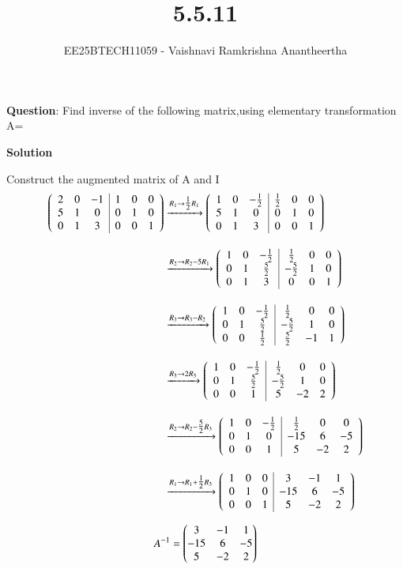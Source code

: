 \documentclass[journal]{IEEEtran}
\title{5.5.11}
\author{EE25BTECH11059 - Vaishnavi Ramkrishna Anantheertha}
\begin{document}
\maketitle

\renewcommand{\thefigure}{\theenumi}
\renewcommand{\thetable}{\theenumi}


\textbf{Question}:
Find inverse of the following matrix,using elementary transformation\\
A=


\textbf{Solution }


Construct the augmented matrix of A and I
\begin{align}
\augvec{3}{3}{
2 & 0 & -1 & 1 & 0 & 0 \\
5 & 1 & 0 & 0 & 1 & 0 \\
0 & 1 & 3 & 0 & 0 & 1}
&\xrightarrow{R_1 \to \tfrac{1}{2}R_1}
\augvec{3}{3}{
1 & 0 & -\tfrac{1}{2} & \tfrac{1}{2} & 0 & 0 \\
5 & 1 & 0 & 0 & 1 & 0 \\
0 & 1 & 3 & 0 & 0 & 1} \\[10pt]
&\xrightarrow{R_2 \to R_2 - 5R_1}
\augvec{3}{3}{
1 & 0 & -\tfrac{1}{2} & \tfrac{1}{2} & 0 & 0 \\
0 & 1 & \tfrac{5}{2} & -\tfrac{5}{2} & 1 & 0 \\
0 & 1 & 3 & 0 & 0 & 1} \\[10pt]
&\xrightarrow{R_3 \to R_3 - R_2}
\augvec{3}{3}{
1 & 0 & -\tfrac{1}{2} & \tfrac{1}{2} & 0 & 0 \\
0 & 1 & \tfrac{5}{2} & -\tfrac{5}{2} & 1 & 0 \\
0 & 0 & \tfrac{1}{2} & \tfrac{5}{2} & -1 & 1} \\[10pt]
&\xrightarrow{R_3 \to 2R_3}
\augvec{3}{3}{
1 & 0 & -\tfrac{1}{2} & \tfrac{1}{2} & 0 & 0 \\
0 & 1 & \tfrac{5}{2} & -\tfrac{5}{2} & 1 & 0 \\
0 & 0 & 1 & 5 & -2 & 2} \\[10pt]
&\xrightarrow{R_2 \to R_2 - \tfrac{5}{2}R_3}
\augvec{3}{3}{
1 & 0 & -\tfrac{1}{2} & \tfrac{1}{2} & 0 & 0 \\
0 & 1 & 0 & -15 & 6 & -5 \\
0 & 0 & 1 & 5 & -2 & 2} \\[10pt]
&\xrightarrow{R_1 \to R_1 + \tfrac{1}{2}R_3}
\augvec{3}{3}{
1 & 0 & 0 & 3 & -1 & 1 \\
0 & 1 & 0 & -15 & 6 & -5 \\
0 & 0 & 1 & 5 & -2 & 2}
\end{align}

\begin{align}
A^{-1}
   =\begin{pmatrix}3 & -1 & 1
          \\
        -15 & 6 & -5
         \\
        5 & -2 & 2
\end{pmatrix}
\end{align}
\end{document}
